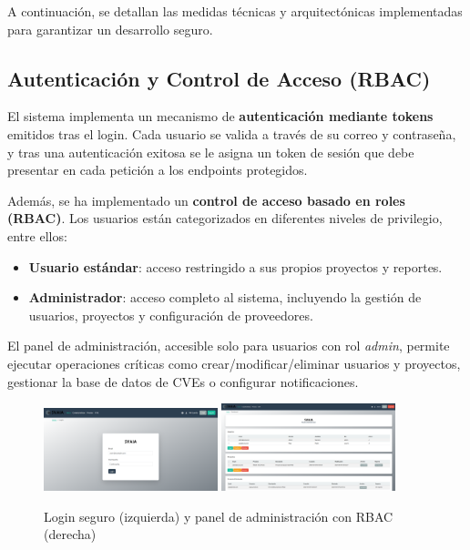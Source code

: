 \documentclass[11pt]{article}
\begin{document}
A continuación, se detallan las medidas técnicas y arquitectónicas implementadas para garantizar un desarrollo seguro.

\subsection{Autenticación y Control de Acceso (RBAC)}

El sistema implementa un mecanismo de \textbf{autenticación mediante tokens} emitidos tras el login. Cada usuario se valida a través de su correo y contraseña, y tras una autenticación exitosa se le asigna un token de sesión que debe presentar en cada petición a los endpoints protegidos.

Además, se ha implementado un \textbf{control de acceso basado en roles (RBAC)}. Los usuarios están categorizados en diferentes niveles de privilegio, entre ellos:

\begin{itemize}
    \item \textbf{Usuario estándar}: acceso restringido a sus propios proyectos y reportes.
    \item \textbf{Administrador}: acceso completo al sistema, incluyendo la gestión de usuarios, proyectos y configuración de proveedores.
\end{itemize}

El panel de administración, accesible solo para usuarios con rol \textit{admin}, permite ejecutar operaciones críticas como crear/modificar/eliminar usuarios y proyectos, gestionar la base de datos de CVEs o configurar notificaciones.

\begin{figure}[H]
    \centering
    \includegraphics[width=0.45\textwidth]{images/svaia_login.png}
    \hfill
    \includegraphics[width=0.45\textwidth]{images/svaia_admin_panel.png}
    \caption{Login seguro (izquierda) y panel de administración con RBAC (derecha)}
\end{figure}
\end{document}
